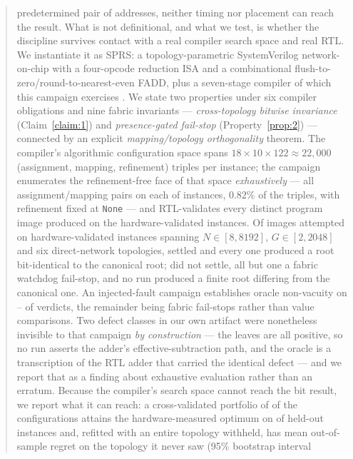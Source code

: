 \documentclass[journal,10pt]{IEEEtran}
\theoremstyle{plain}
\theoremstyle{definition}
\theoremstyle{remark}
\newcommand{\sprs}{\textsc{SPRS}}
\newcommand{\sv}[1]{\texttt{#1}}
\begin{document}
{\begin{abstract}
predetermined pair of addresses, neither timing nor placement can reach the
result.  What is not definitional, and what we test, is whether the discipline
survives contact with a real compiler search space and real RTL.  We
instantiate it as \sprs{}: a topology-parametric SystemVerilog
network-on-chip with a four-opcode reduction ISA and a combinational
flush-to-zero/round-to-nearest-even FADD, plus a seven-stage compiler of
which this campaign exercises \StagesRun{}.  We
state two properties under six compiler obligations and nine fabric
invariants --- \emph{cross-topology bitwise invariance}
(Claim~\ref{claim:1}) and \emph{presence-gated fail-stop}
(Property~\ref{prop:2}) --- connected by an explicit \emph{mapping/topology
orthogonality} theorem.  The compiler's algorithmic configuration space spans
$18\times 10\times 122 \approx 22{,}000$ (assignment, mapping, refinement)
triples per instance; the campaign enumerates the refinement-free face of that
space \emph{exhaustively} --- all \SelConfigsTotal{} assignment/mapping pairs
on each of \SuiteSize{} instances, $0.82\%$ of the triples, with refinement
fixed at \sv{None} --- and RTL-validates every distinct program image
produced on the \TournNInst{} hardware-validated instances.  Of
\InvAttempted{} images attempted on \TournNInst{}
hardware-validated instances spanning $N\!\in\![8,8192]$,
$G\!\in\![2,2048]$ and six direct-network topologies, \WallTBs{} settled and
every one produced a root bit-identical to the canonical root;
\InvNonSettling{} did not settle, all but one a fabric watchdog fail-stop, and
no run produced a finite root differing from the canonical one.  An
injected-fault campaign establishes oracle non-vacuity on
\MutOracleLo{}--\MutOracleHi{} of \MutTotal{} verdicts, the remainder being
fabric fail-stops rather than value comparisons.  Two defect classes in our own
artifact were nonetheless invisible to that campaign \emph{by construction} ---
the leaves are all positive, so no run asserts the adder's
effective-subtraction path, and the oracle is a transcription of the RTL adder
that carried the identical defect --- and we report that as a finding about
exhaustive evaluation rather than an erratum.  Because the compiler's
search space cannot reach the bit result, we report what it can reach: a
cross-validated portfolio of \SelConfigsRun{} of the \SelConfigsTotal{}
configurations attains the hardware-measured optimum on \SelKFourOpt{} of
\TournNInst{} held-out instances and, refitted with an entire topology
withheld, has mean out-of-sample regret \SelUnseenTopoMean{} on the topology
it never saw (95\% bootstrap interval

\end{abstract}}
\end{document}
